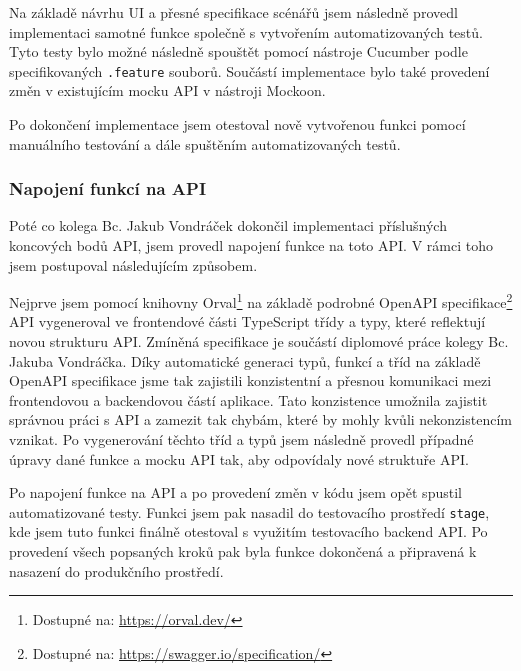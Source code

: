 Na základě návrhu UI a přesné specifikace scénářů jsem následně provedl implementaci samotné funkce společně s vytvořením automatizovaných testů. Tyto testy bylo možné následně spouštět pomocí nástroje Cucumber podle specifikovaných \texttt{.feature} souborů. Součástí implementace bylo také provedení změn v existujícím mocku API v nástroji Mockoon.

Po dokončení implementace jsem otestoval nově vytvořenou funkci pomocí manuálního testování a dále spuštěním automatizovaných testů.

\subsubsection{Napojení funkcí na API}

Poté co kolega Bc. Jakub Vondráček dokončil implementaci příslušných koncových bodů API, jsem provedl napojení funkce na toto API. V rámci toho jsem postupoval následujícím způsobem.

Nejprve jsem pomocí knihovny Orval\footnote{Dostupné na: \href{https://orval.dev/}{https://orval.dev/}} na základě podrobné OpenAPI specifikace\footnote{Dostupné na: \href{https://swagger.io/specification/}{https://swagger.io/specification/}} API vygeneroval ve frontendové části TypeScript třídy a typy, které reflektují novou strukturu API. Zmíněná specifikace je součástí diplomové práce kolegy Bc. Jakuba Vondráčka. Díky automatické generaci typů, funkcí a tříd na základě OpenAPI specifikace jsme tak zajistili konzistentní a přesnou komunikaci mezi frontendovou a backendovou částí aplikace. Tato konzistence umožnila zajistit správnou práci s API a zamezit tak chybám, které by mohly kvůli nekonzistencím vznikat. Po vygenerování těchto tříd a typů jsem následně provedl případné úpravy dané funkce a mocku API tak, aby odpovídaly nové struktuře API.

Po napojení funkce na API a po provedení změn v kódu jsem opět spustil automatizované testy. Funkci jsem pak nasadil do testovacího prostředí \texttt{stage}, kde jsem tuto funkci finálně otestoval s využitím testovacího backend API. Po provedení všech popsaných kroků pak byla funkce dokončená a připravená k nasazení do produkčního prostředí. 

